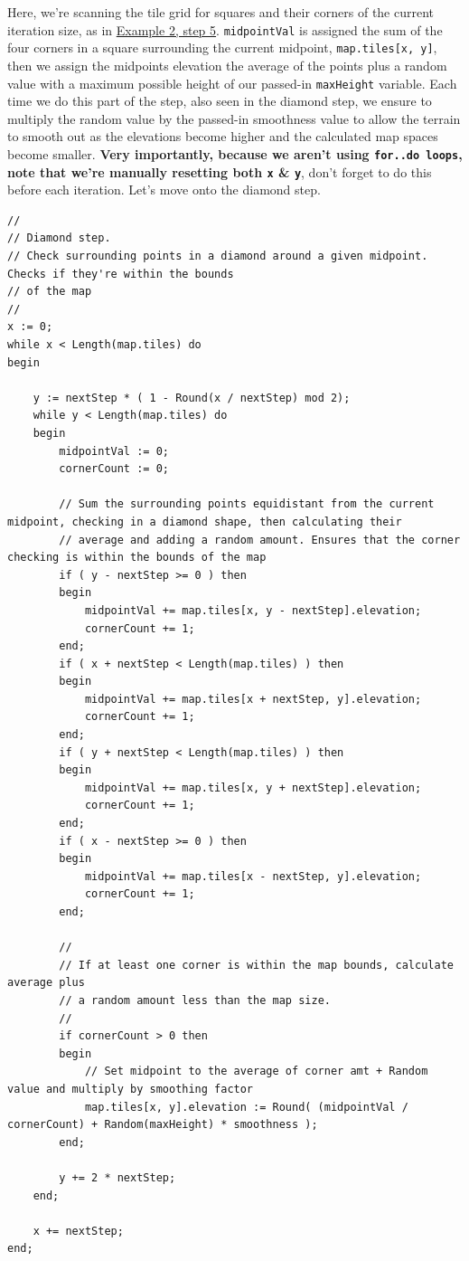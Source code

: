 \documentclass{article}
\begin{document}
Here, we're scanning the tile grid for squares and their corners of the current iteration size, as in \hyperref[fig:graph]{Example 2, step 5}. \texttt{midpointVal} is assigned the sum of the four corners in a square surrounding the current midpoint, \texttt{map.tiles[x, y]}, then we assign the midpoints elevation the average of the points plus a random value with a maximum possible height of our passed-in \texttt{maxHeight} variable. Each time we do this part of the step, also seen in the diamond step, we ensure to multiply the random value by the passed-in smoothness value to allow the terrain to smooth out as the elevations become higher and the calculated map spaces become smaller. \textbf{Very importantly, because we aren't using \texttt{for..do loops}, note that we're manually resetting both \texttt{x} \& \texttt{y}}, don't forget to do this before each iteration. Let's move onto the diamond step.

\begin{verbatim}
//
// Diamond step.
// Check surrounding points in a diamond around a given midpoint. Checks if they're within the bounds
// of the map
//
x := 0;
while x < Length(map.tiles) do
begin

	y := nextStep * ( 1 - Round(x / nextStep) mod 2);
	while y < Length(map.tiles) do
	begin
		midpointVal := 0;
		cornerCount := 0;

		// Sum the surrounding points equidistant from the current midpoint, checking in a diamond shape, then calculating their
		// average and adding a random amount. Ensures that the corner checking is within the bounds of the map
		if ( y - nextStep >= 0 ) then
		begin
			midpointVal += map.tiles[x, y - nextStep].elevation;
			cornerCount += 1;
		end;
		if ( x + nextStep < Length(map.tiles) ) then
		begin
			midpointVal += map.tiles[x + nextStep, y].elevation;
			cornerCount += 1;
		end;
		if ( y + nextStep < Length(map.tiles) ) then
		begin
			midpointVal += map.tiles[x, y + nextStep].elevation;
			cornerCount += 1;
		end;
		if ( x - nextStep >= 0 ) then
		begin
			midpointVal += map.tiles[x - nextStep, y].elevation;
			cornerCount += 1;
		end;

		//
		// If at least one corner is within the map bounds, calculate average plus
		// a random amount less than the map size.
		//
		if cornerCount > 0 then
		begin
			// Set midpoint to the average of corner amt + Random value and multiply by smoothing factor
			map.tiles[x, y].elevation := Round( (midpointVal / cornerCount) + Random(maxHeight) * smoothness );
		end;

		y += 2 * nextStep;
	end;

	x += nextStep;
end;
\end{verbatim}
\end{document}
